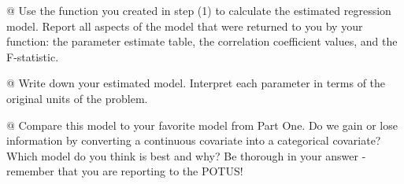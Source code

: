 \documentclass[10pt]{article}\usepackage[]{graphicx}\usepackage[]{xcolor}
\begin{document}
\begin{easylist}[enumerate]
    @ Use the function you created in step (1) to calculate the estimated regression model. Report all aspects of the
    model that were returned to you by your function: the parameter estimate table, the correlation coefficient values,
    and the F-statistic.\newline

    @ Write down your estimated model. Interpret each parameter in terms of the original units of the problem.\newline

    @ Compare this model to your favorite model from Part One. Do we gain or lose information by converting a continuous
    covariate into a categorical covariate? Which model do you think is best and why? Be thorough in your answer -
    remember that you are reporting to the POTUS!\newline
\end{easylist}
\end{document}
